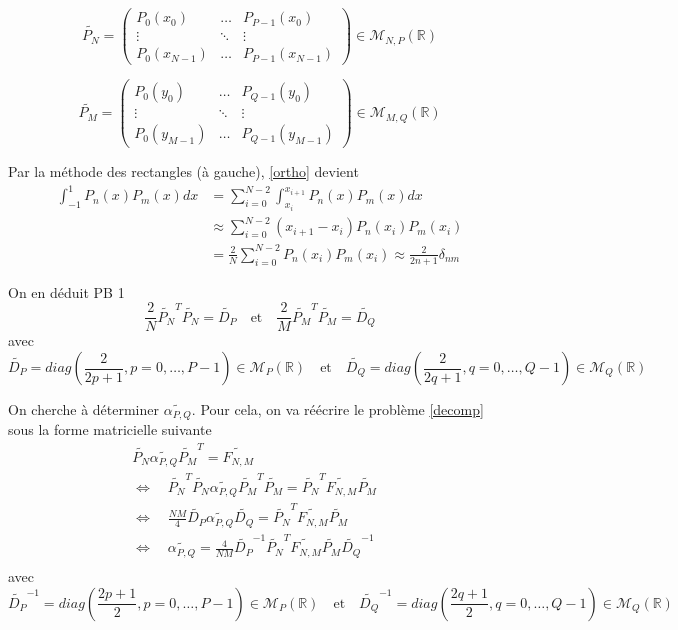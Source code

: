 $$\widetilde{P_N}=\begin{pmatrix}
	P_0(x_0) & \dots & P_{P-1}(x_0) \\
	\vdots & \ddots & \vdots \\
	P_0(x_{N-1}) & \dots & P_{P-1}(x_{N-1})
\end{pmatrix}\in\mathcal{M}_{N,P}(\mathbb{R})$$

$$\widetilde{P_M}=\begin{pmatrix}
	P_0(y_0) & \dots & P_{Q-1}(y_0) \\
	\vdots & \ddots & \vdots \\
	P_0(y_{M-1}) & \dots & P_{Q-1}(y_{M-1})
\end{pmatrix}\in\mathcal{M}_{M,Q}(\mathbb{R})$$

Par la méthode des rectangles (à gauche), \ref{ortho} devient
\begin{align*}
	\int_{-1}^1 P_n(x)P_m(x)dx&=\sum_{i=0}^{N-2}\int_{x_i}^{x_{i+1}}P_n(x)P_m(x)dx \\
	&\approx \sum_{i=0}^{N-2} (x_{i+1}-x_i)P_n(x_i)P_m(x_i) \\
	&=\frac{2}{N}\sum_{i=0}^{N-2} P_n(x_i)P_m(x_i) \approx\frac{2}{2n+1}\delta_{nm} 
\end{align*}

On en déduit \color{red}PB 1\color{black}
\begin{equation}
	\frac{2}{N}\widetilde{P_N}^T\widetilde{P_N}=\widetilde{D_P} \quad \text{et} \quad \frac{2}{M}\widetilde{P_M}^T\widetilde{P_M}=\widetilde{D_Q}
	\label{diag}
\end{equation}
avec
$$\widetilde{D_P}=diag\left(\frac{2}{2p+1},p=0,\dots,P-1\right)\in\mathcal{M}_P(\mathbb{R}) \quad \text{et} \quad \widetilde{D_Q}=diag\left(\frac{2}{2q+1},q=0,\dots,Q-1\right)\in\mathcal{M}_Q(\mathbb{R})$$

On cherche à déterminer $\widetilde{\alpha_{P,Q}}$. Pour cela, on va réécrire le problème \ref{decomp} sous la forme matricielle suivante
\begin{align*}
	\widetilde{P_N}\widetilde{\alpha_{P,Q}}\widetilde{P_M}^T=\widetilde{F_{N,M}}& \\
	\iff \quad \widetilde{P_N}^T\widetilde{P_N}\widetilde{\alpha_{P,Q}}\widetilde{P_M}^T\widetilde{P_M}=\widetilde{P_N}^T\widetilde{F_{N,M}}\widetilde{P_M}& \\
	\iff \quad \frac{NM}{4}\widetilde{D_P}\widetilde{\alpha_{P,Q}}\widetilde{D_Q}=\widetilde{P_N}^T\widetilde{F_{N,M}}\widetilde{P_M}& \\
	\iff \quad \boxed{\widetilde{\alpha_{P,Q}}=\frac{4}{NM}\widetilde{D_P}^{-1}\widetilde{P_N}^T\widetilde{F_{N,M}}\widetilde{P_M}\widetilde{D_Q}^{-1}}& \\
\end{align*}
avec
$$\widetilde{D_P}^{-1}=diag\left(\frac{2p+1}{2},p=0,\dots,P-1\right)\in\mathcal{M}_P(\mathbb{R}) \quad \text{et} \quad \widetilde{D_Q}^{-1}=diag\left(\frac{2q+1}{2},q=0,\dots,Q-1\right)\in\mathcal{M}_Q(\mathbb{R})$$

